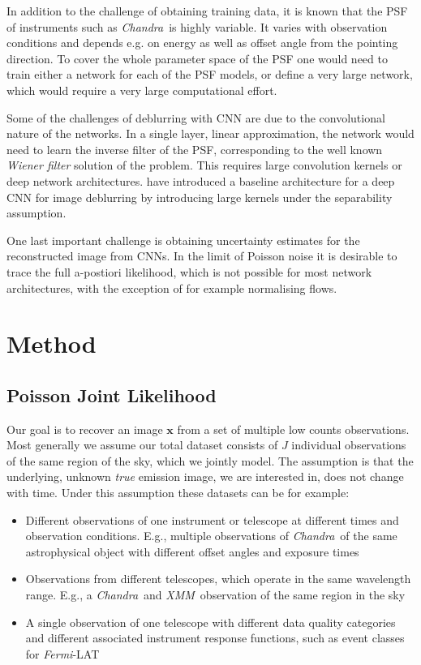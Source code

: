 \documentclass[twocolumn]{aastex631}
\newcommand{\chandra}{\textit{Chandra}~}
\newcommand{\xmm}{\textit{XMM}~}
\newcommand{\fermi}{\textit{Fermi}-LAT~}
\begin{document}
    In addition to the challenge of obtaining training data, it is known that the PSF of instruments such as \chandra is highly variable. It varies with observation conditions and depends e.g. on energy as well as offset angle from the pointing direction. To cover the whole parameter space of the PSF one would need to train either a network for each of the PSF models, or define a very large network, which would require a very large computational effort.

    Some of the challenges of deblurring with CNN are due to the convolutional nature of the networks. In a single layer, linear approximation, the network would need to learn the inverse filter of the PSF, corresponding to the well known \textit{Wiener filter} solution of the problem. This requires large convolution kernels or deep network architectures. \cite{Li2014} have introduced a baseline architecture for a deep CNN for image deblurring by introducing large kernels under the separability assumption.
    
    One last important challenge is obtaining uncertainty estimates for the reconstructed image from CNNs. In the limit of Poisson noise it is desirable to trace the full a-postiori likelihood, which is not possible for most network architectures, with the exception of for example normalising flows.

    \section{Method}
    \subsection{Poisson Joint Likelihood}
    Our goal is to recover an image $\mathbf{x}$ from a set of multiple low counts observations. Most generally we assume our total dataset consists of $J$ individual observations of the same region of the sky, which we jointly model. The assumption is that the underlying, unknown \textit{true} emission image, we are interested in, does not change with time. Under this assumption these datasets can be for example:

    \begin{itemize}
        \item Different observations of one instrument or telescope at different times and observation conditions. E.g., multiple observations of \chandra of the same astrophysical object with different offset angles and exposure times
        \item Observations from different telescopes, which operate in the same wavelength range. E.g., a \chandra and \xmm observation of the same region in the sky
        \item A single observation of one telescope with different data quality categories and different associated instrument response functions, such as event classes for \fermi
    \end{itemize}
\end{document}
